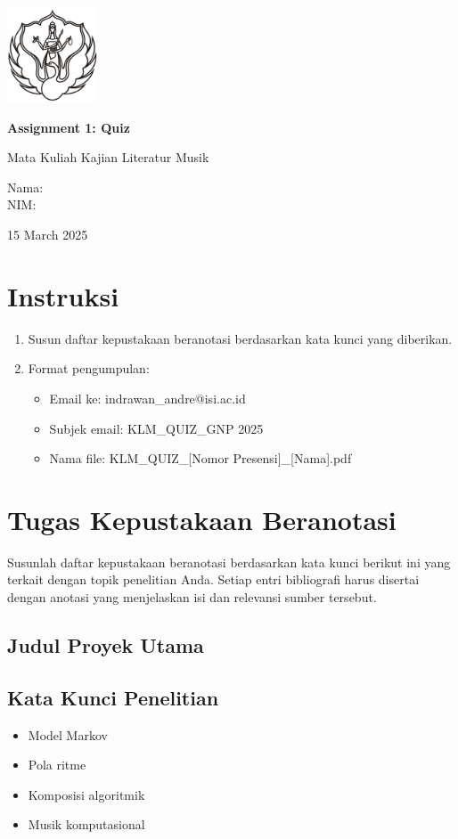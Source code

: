 \documentclass[a4paper,12pt]{article}
\newcommand{\AssignmentTitle}{Assignment 1: Quiz}
\renewcommand{\maketitle}{
  \begin{titlepage}
    \centering
    \includegraphics[width=0.2\textwidth]{../images/logo.png}\par\vspace{1cm}
    {\Huge\bfseries \AssignmentTitle}\par\vspace{0.5em}
    {\Large Mata Kuliah Kajian Literatur Musik}\par\vspace{2cm}
    {\large Nama: \AuthorName\\NIM: \AuthorNIM}\par\vspace{1cm}
    {\large 15 March 2025}\par
  \end{titlepage}
}
\begin{document}
\maketitle

\section*{Instruksi}
\begin{enumerate}
    \item Susun daftar kepustakaan beranotasi berdasarkan kata kunci yang diberikan.
    \item Format pengumpulan:
    \begin{itemize}
        \item Email ke: indrawan\_andre@isi.ac.id
        \item Subjek email: KLM\_QUIZ\_GNP 2025
        \item Nama file: KLM\_QUIZ\_[Nomor Presensi]\_[Nama].pdf
    \end{itemize}
\end{enumerate}

\section*{Tugas Kepustakaan Beranotasi}
Susunlah daftar kepustakaan beranotasi berdasarkan kata kunci berikut ini yang terkait dengan topik penelitian Anda. Setiap entri bibliografi harus disertai dengan anotasi yang menjelaskan isi dan relevansi sumber tersebut.

\subsection*{Judul Proyek Utama}
\ThesisTitle

\subsection*{Kata Kunci Penelitian}
\begin{itemize}
    \item Model Markov
    \item Pola ritme
    \item Komposisi algoritmik
    \item Musik komputasional
\end{itemize}

\vspace{1cm}
\end{document}
